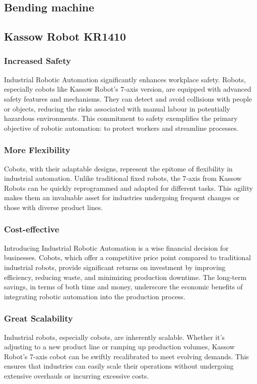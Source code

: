 \subsection{Bending machine}


\subsection{Kassow Robot KR1410}

\subsubsection{Increased Safety}

Industrial Robotic Automation significantly enhances workplace safety. Robots, especially cobots like Kassow Robot's 7-axis version, are equipped with advanced safety features and mechanisms. 
They can detect and avoid collisions with people or objects, reducing the risks associated with manual labour in potentially hazardous environments. This commitment to safety exemplifies the primary objective of robotic automation: to protect workers and streamline processes.

\subsubsection{More Flexibility}
Cobots, with their adaptable designs, represent the epitome of flexibility in industrial automation. 
Unlike traditional fixed robots, the 7-axis from Kassow Robots can be quickly reprogrammed and adapted for different tasks. This agility makes them an invaluable asset for industries undergoing frequent changes or those with diverse product lines.

\subsubsection{Cost-effective}
Introducing Industrial Robotic Automation is a wise financial decision for businesses. Cobots, which offer a competitive price point compared to traditional industrial robots, provide significant returns on investment by improving efficiency, reducing waste, and minimizing production downtime. 
The long-term savings, in terms of both time and money, underscore the economic benefits of integrating robotic automation into the production process.

\subsubsection{Great Scalability}
Industrial robots, especially cobots, are inherently scalable. Whether it's adjusting to a new product line or ramping up production volumes, Kassow Robot's 7-axis cobot can be swiftly recalibrated to meet evolving demands. 
This ensures that industries can easily scale their operations without undergoing extensive overhauls or incurring excessive costs.

